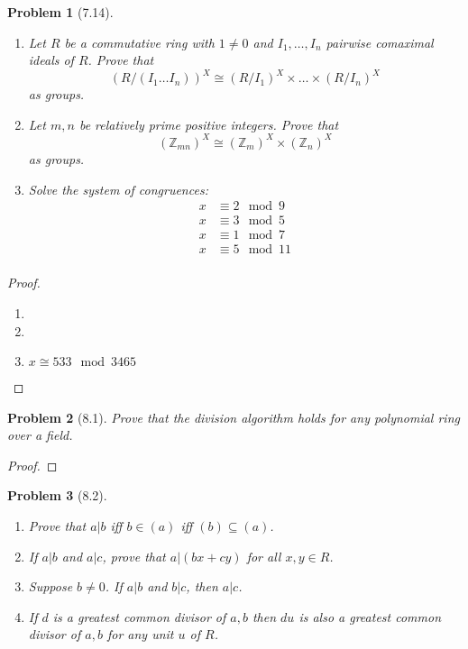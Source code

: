 \documentclass[10pt]{article}
\newcommand{\sk}{\vskip 10mm}
\newcommand{\bb}[1]{\mathbb{#1}}
\theoremstyle{plain}
\newtheorem{problem}{Problem}
\theoremstyle{remark}
\begin{document}
\begin{problem}[7.14]
  \begin{enumerate}
  \item Let $R$ be a commutative ring with $1\neq 0$ and $I_1,\ldots,I_n$
    pairwise comaximal ideals of $R$. Prove that
    \[ (R/(I_1\ldots I_n))^X\cong (R/I_1)^X\times\ldots\times(R/I_n)^X \]
    as groups.
  \item Let $m,n$ be relatively prime positive integers. Prove that
    \[ (\bb{Z}_{mn})^X\cong (\bb{Z}_m)^X\times(\bb{Z}_n)^X \]
    as groups.
  \item Solve the system of congruences:
    \begin{align*}
      x &\equiv 2 \mod 9\\
      x &\equiv 3 \mod 5\\
      x &\equiv 1 \mod 7\\
      x &\equiv 5 \mod 11\\
    \end{align*}
  \end{enumerate}
\end{problem}

\begin{proof}
  \begin{enumerate}
  \item
  \item
  \item $x\cong 533 \mod 3465$
  \end{enumerate}
\end{proof}

\sk

\begin{problem}[8.1]
  Prove that the division algorithm holds for any polynomial ring over a field.
\end{problem}

\begin{proof}
  
\end{proof}

\sk

\begin{problem}[8.2]
  \begin{enumerate}
  \item Prove that $a|b$ iff $b\in(a)$ iff $(b)\subseteq(a)$.
  \item If $a|b$ and $a|c$, prove that $a|(bx+cy)$ for all $x,y\in R$.
  \item Suppose $b\neq 0$. If $a|b$ and $b|c$, then $a|c$.
  \item If $d$ is a greatest common divisor of $a,b$ then $du$
    is also a greatest common divisor of $a,b$ for any unit $u$
    of $R$.
  \end{enumerate}
\end{problem}
\end{document}
